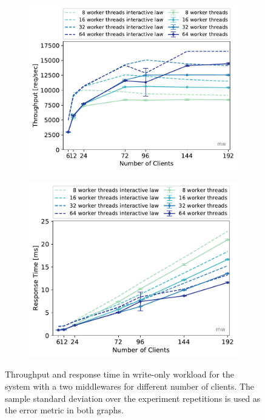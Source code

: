 \documentclass[report.tex]{subfiles}
\begin{document}
\begin{figure}
	\begin{subfigure}[b]{.49\linewidth}
		\centering
		\includegraphics[width=\linewidth]{data/exp32_wo_tp_nc_w.pdf}
	\end{subfigure}\hfill
	\begin{subfigure}[b]{.49\linewidth}
		\centering
		\includegraphics[width=\linewidth]{data/exp32_wo_rt_nc_w.pdf}
	\end{subfigure}%
	\caption{Throughput and response time in write-only workload for the system with a two middlewares for different number of clients. The sample standard deviation over the experiment repetitions is used as the error metric in both graphs.}\label{exp32_wo_tp_nc}
\end{figure}
\end{document}
